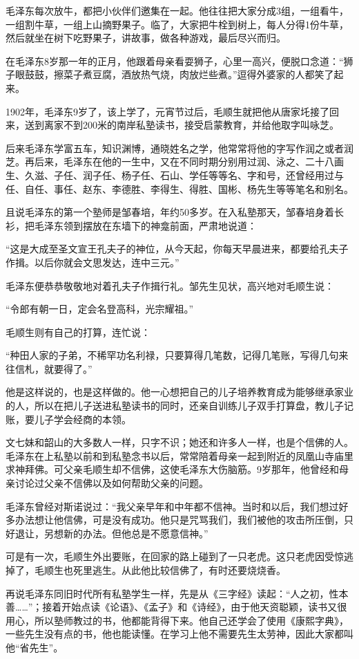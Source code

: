 \documentclass[../../dazhuan.tex]{subfiles}
\begin{document}
毛泽东每次放牛，都把小伙伴们邀集在一起。他往往把大家分成3组，一组看牛，一组割牛草，一组上山摘野果子。临了，大家把牛栓到树上，每人分得1份牛草，然后就坐在树下吃野果子，讲故事，做各种游戏，最后尽兴而归。

在毛泽东8岁那一年的正月，他跟着母亲看耍狮子，心里一高兴，便脱口念道：“狮子眼鼓鼓，擦菜子煮豆腐，酒放热气烧，肉放烂些煮。”逗得外婆家的人都笑了起来。

1902年，毛泽东9岁了，该上学了，元宵节过后，毛顺生就把他从唐家圫接了回来，送到离家不到200米的南岸私塾读书，接受启蒙教育，并给他取字叫咏芝。

后来毛泽东学富五车，知识渊博，通晓姓名之学，他常常将他的字写作润之或者润芝。再后来，毛泽东在他的一生中，又在不同时期分别用过润、泳之、二十八画生、久滋、子任、润子任、杨子任、石山、学任等等名、字和号，还曾经用过与任、自任、事任、赵东、李德胜、李得生、得胜、国彬、杨先生等等笔名和别名。

且说毛泽东的第一个塾师是邹春培，年约50多岁。在入私塾那天，邹春培身着长衫，把毛泽东领到摆放在东墙下的神龛前面，严肃地说道：

“这是大成至圣文宣王孔夫子的神位，从今天起，你每天早晨进来，都要给孔夫子作揖。以后你就会文思发达，连中三元。”

毛泽东便恭恭敬敬地对着孔夫子作揖行礼。邹先生见状，高兴地对毛顺生说：

“令郎有朝一日，定会名登高科，光宗耀祖。”

毛顺生则有自己的打算，连忙说：

“种田人家的子弟，不稀罕功名利禄，只要算得几笔数，记得几笔账，写得几句来往信札，就要得了。”

他是这样说的，也是这样做的。他一心想把自己的儿子培养教育成为能够继承家业的人，所以在把儿子送进私塾读书的同时，还亲自训练儿子双手打算盘，教儿子记账，要儿子学会经商的本领。

文七妹和韶山的大多数人一样，只字不识；她还和许多人一样，也是个信佛的人。毛泽东在上私塾以前和到私塾念书以后，常常陪着母亲一起到附近的凤凰山寺庙里求神拜佛。可父亲毛顺生却不信佛，这使毛泽东大伤脑筋。9岁那年，他曾经和母亲讨论过父亲不信佛以及如何帮助父亲的问题。

毛泽东曾经对斯诺说过：“我父亲早年和中年都不信神。当时和以后，我们想过好多办法想让他信佛，可是没有成功。他只是咒骂我们，我们被他的攻击所压倒，只好退让，另想新的办法。但他总是不愿意信神。”

可是有一次，毛顺生外出要账，在回家的路上碰到了一只老虎。这只老虎因受惊逃掉了，毛顺生也死里逃生。从此他比较信佛了，有时还要烧烧香。

再说毛泽东同旧时代所有私塾学生一样，先是从《三字经》读起：“人之初，性本善……”；接着开始点读《论语》、《孟子》和《诗经》，由于他天资聪颖，读书又很用心，所以塾师教过的书，他都能背得下来。他自己还学会了使用《康熙字典》，一些先生没有点的书，他也能读懂。在学习上他不需要先生太劳神，因此大家都叫他“省先生”。
\end{document}
